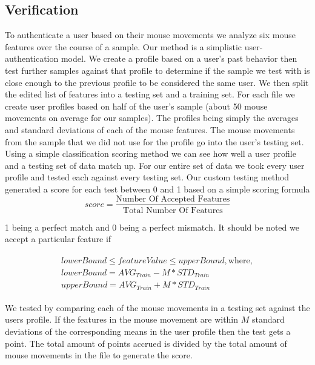 \documentclass[conference]{IEEEtran}
\begin{document}
\subsection{Verification}
	To authenticate a user based on their mouse movements we analyze six mouse features over the course of a sample. Our method is a simplistic user-authentication model. We create a profile based on a user's past behavior then test further samples against that profile to determine if the sample we test with is close enough to the previous profile to be considered the same user.  
We then split the edited list of features into a testing set and a training set. For each file we create user profiles based on half of the user's sample (about 50 mouse movements on average for our samples). The profiles being simply the averages and standard deviations of each of the mouse features. The mouse movements from the sample that we did not use for the profile go into the user's testing set.
Using a simple classification scoring method we can see how well a user profile and a testing set of data match up. For our entire set of data we took every user profile and tested each against every testing set. Our custom testing method generated a score for each test between 0 and 1 based on a simple scoring formula 
\begin{equation} 
score = \frac{\text{Number Of Accepted Features}}{\text{Total Number Of Features}}
\end{equation}

1 being a perfect match and 0 being a perfect mismatch. It should be noted we accept a particular feature if

\begin{equation}
\begin{split}
\begin{gathered}
   lowerBound \leq featureValue \leq upperBound, \text{where},\\
   lowerBound = AVG_{Train} - M * STD_{Train}\\
   upperBound = AVG_{Train} + M * STD_{Train}
\end{gathered}
\end{split}
\end{equation}


We tested by comparing each of the mouse movements in a testing set against the users profile. If the features in the mouse movement are within $M$ standard deviations of the corresponding means in the user profile then the test gets a point. The total amount of points accrued is divided by the total amount of mouse movements in the file to generate the score.
	
\end{document}
